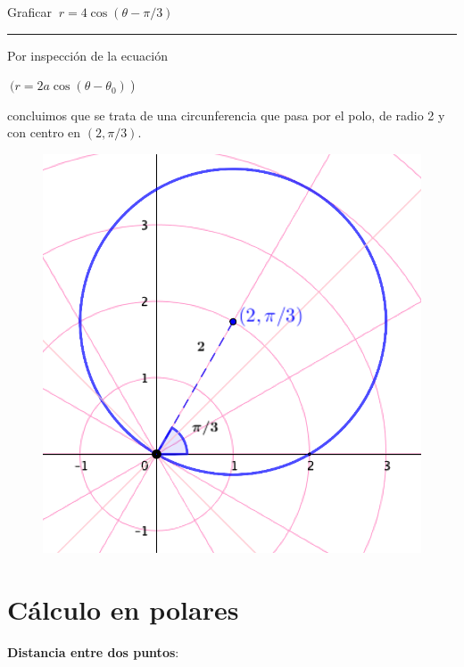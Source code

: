 \begin{miejercicio} 
	

 Graficar $\  r=4\cos (\theta-\pi/3)$ 

 \rule{300pt}{0.2pt}

\begin{multicols}{2}
Por inspección de la ecuación 

\textcolor{gris}{$\ (r=2a \cos (\theta-\theta_0) \ $) }

concluimos que se trata de una circunferencia que pasa por el polo, de radio 2 y con centro en $(2,\pi/3)$.
\begin{figure}[H]
	\centering
	\includegraphics[width=.25\textwidth]{img-polares/polares43.png}
\end{figure}
\vspace{2mm}
\end{multicols}

\end{miejercicio}




\vspace{5mm}
\section{Cálculo en polares}

\vspace{-5mm}
\vspace{0.5cm}


\vspace{5mm}

\large{\textbf{Distancia entre dos puntos}}\normalsize{:}

